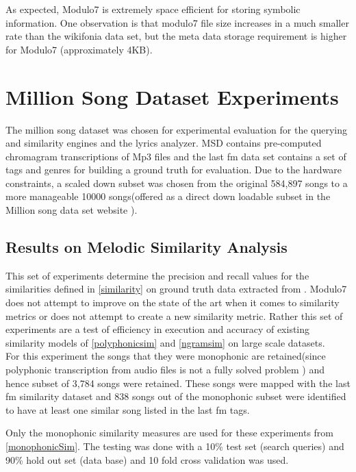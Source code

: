 \noindent As expected, Modulo7 is extremely space efficient for storing symbolic information. One observation is that modulo7 file size increases in a much smaller rate than the wikifonia data set, but the meta data storage requirement is higher for Modulo7 (approximately 4KB). 
\section{Million Song Dataset Experiments} 

\noindent The million song dataset was chosen for experimental evaluation \cite{msd} for the querying and similarity engines and the lyrics analyzer. MSD contains pre-computed chromagram transcriptions of Mp3 files and the last fm data set contains a set of tags and genres for building a  ground truth for evaluation. Due to the hardware constraints, a scaled down subset was chosen from the original 584,897 songs to a more manageable 10000 songs(offered as a direct down loadable subset in the Million song data set website \cite{msddownloadable}).

\subsection{Results on Melodic Similarity Analysis} \label{msdsimexpts}

\noindent This set of experiments determine the precision and recall values for the similarities defined in \ref{similarity} on ground truth data extracted from \cite{msd}. Modulo7 does not attempt to improve on the state of the art when it comes to similarity metrics or does not attempt to create a new similarity metric. Rather this set of experiments are a test of efficiency in execution and accuracy of existing similarity models of \ref{polyphonicsim} and \ref{ngramsim} on large scale datasets. \\

\noindent For this experiment the songs that they were monophonic are retained(since polyphonic transcription from audio files is not a fully solved problem \cite{melextract}) and hence subset of 3,784 songs were retained. These songs were mapped with the last fm similarity dataset and 838 songs out of the monophonic subset were identified to have at least one similar song listed in the last fm tags. 

\noindent Only the monophonic similarity measures are used for these experiments from \ref{monophonicSim}. The testing was done with a 10\% test set (search queries) and 90\% hold out set (data base) and 10 fold cross validation was used. \\

